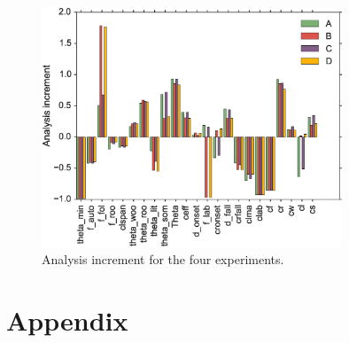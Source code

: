 \documentclass[11pt]{article}
\begin{document}
\begin{figure}[ht]
    \centering
    \includegraphics[width=0.8\textwidth]{inc.eps}
    \caption{Analysis increment for the four experiments.}
    \label{fig:testgradcostone}
\end{figure}

\section*{Appendix}
\end{document}
